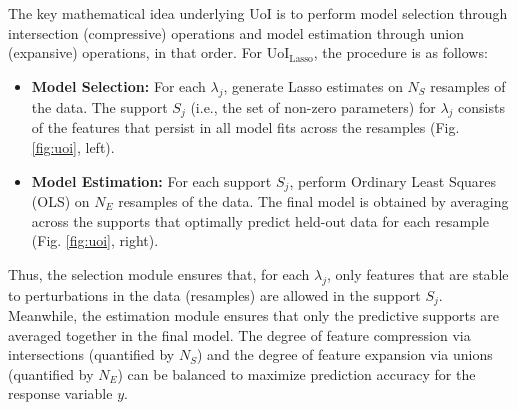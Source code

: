 \documentclass[letterpaper, 10 pt, conference]{ieeeconf}  %
\begin{document}
The key mathematical idea underlying UoI is to perform
model selection through intersection (compressive) operations and model estimation through union (expansive) operations, in that order. For UoI$_{\text{Lasso}}$, the procedure is as follows:
\begin{itemize}
    \item \textbf{Model Selection:} For each $\lambda_j$, generate Lasso estimates on $N_S$ resamples of the data. The support $S_j$ (i.e., the set of non-zero parameters) for $\lambda_j$ consists of the features that persist in all model fits across the resamples (Fig. \ref{fig:uoi}, left).
    \item \textbf{Model Estimation:} For each support $S_j$, perform Ordinary Least Squares (OLS) on $N_E$ resamples of the data. The final model is obtained by averaging across the supports that optimally predict held-out data for each resample (Fig. \ref{fig:uoi}, right). 
\end{itemize}
Thus, the selection module ensures that, for each $\lambda_j$, only features that are stable to perturbations in the data (resamples) are allowed in the support $S_j$. Meanwhile, the estimation module ensures that only the predictive supports are averaged together in the final model. The degree of feature compression via intersections (quantified by $N_S$) and the degree of feature expansion via unions (quantified by $N_E$) can be balanced to maximize prediction accuracy for the response variable $y$.
\end{document}
